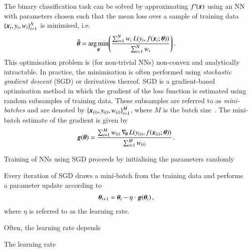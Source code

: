 The binary classification task can be solved by approximating
$f^{*\!}(\myvec{x})$ using an NN with parameters chosen such that the mean loss
over a sample of training data~$\{\myvec{x}_i, y_i, w_i\}_{i = 1}^N$ is
minimised, i.e.\
\begin{align*}
  \myvec{\hat{\theta}} =
  \argmin_{\myvec{\theta}}\mathopen{}\left(
  \frac{\sum_{i = 1}^{N} w_i \, L(y_i, f(\myvec{x}_i; \myvec{\theta}))}{\sum_{i = 1}^{N} w_i}
  \right)\mathclose{}
  \,\text{.}
\end{align*}
This optimisation problem is (for non-trivial NNs) non-convex and analytically
intractable. In practice, the minimisation is often performed using
\emph{stochastic gradient descent} (SGD) or derivatives thereof. SGD is a
gradient-based optimisation method in which the gradient of the loss function is
estimated using random subsamples of training data. These subsamples are
referred to as \emph{mini-batches} and are denoted by
$\{\myvec{x}_{(i)}, y_{(i)}, w_{(i)}\}_{i=1}^{M}$, where $M$ is the batch
size~\cite{Goodfellow-et-al-2016}. The mini-batch estimate of the gradient is
given by
\begin{align*}
  \myvec{g}(\myvec{\theta})
  = \frac{
  \sum_{i=1}^{M} w_{(i)} \, \nabla_{\!\myvec{\theta}} \, L(y_{(i)}, f(\myvec{x}_{(i)}; \myvec{\theta}))
  }{
  \sum_{i=1}^{M} w_{(i)}
  } \,\text{.}
\end{align*}





Training of NNs using SGD proceeds by initialising the parameters randomly









Every iteration of SGD draws a mini-batch from the training data and performs a
parameter update according to
\begin{align*}
  \myvec{\theta}_{t + 1} = \myvec{\theta}_{t} - \eta \cdot \myvec{g}(\myvec{\theta}_{t}) \,\text{,}
\end{align*}
where $\eta$ is referred to as the learning rate.



Often, the learning rate
depends





The learning rate











